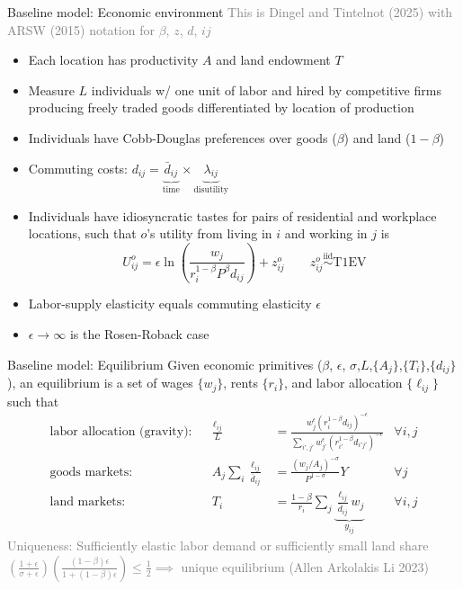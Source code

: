 \documentclass[11pt,notes=hide,aspectratio=169]{beamer}
\begin{document}
\begin{frame}{Baseline model: Economic environment}
\textcolor{gray}{This is Dingel and Tintelnot (2025) with ARSW (2015) notation for $\beta$, $z$, $d$, $ij$}
\begin{itemize}
\item
Each location has productivity $A$ and land endowment $T$
\item 
Measure $L$ individuals w/ one unit of labor
and hired by 
competitive firms producing freely traded goods differentiated by location of production
\item
Individuals have Cobb-Douglas preferences over goods ($\beta$) and land ($1-\beta$) 
\item
Commuting costs: $d_{ij} = \underbrace{\bar{d}_{ij}}_{\text{time}} \times \underbrace{\lambda_{ij}}_{\text{disutility}}$
\item
Individuals have idiosyncratic tastes for pairs of residential and workplace locations,
such that
$o$'s utility from living in $i$ and working in $j$ is
\begin{equation*}
U_{ij}^{o} = \epsilon \ln\left(\frac{w_j}{r_i^{1-\beta} P^\beta d_{ij}}\right) + z_{ij}^{o}
\qquad
z_{ij}^{o} \stackrel{\text{iid}}{\sim} \text{T1EV}
\end{equation*}
\item Labor-supply elasticity equals commuting elasticity $\epsilon$
\item $\epsilon \to \infty$ is the Rosen-Roback case
\end{itemize}
\end{frame}
\begin{frame}{Baseline model: Equilibrium}
Given economic primitives ($\beta$, $\epsilon$, $\sigma$,$L$,$\{A_j\}$,$\{T_i\}$,$\{d_{ij}\}$),
an equilibrium is a set of wages $\{w_j\}$, rents $\{r_i\}$, and labor allocation $\{\ell_{ij}\}$
such that
\begin{align}
\text{labor allocation (gravity):}&&
\frac{\ell_{ij}}{L}
&=
\frac
{w_{j}^\epsilon \left(r_{i}^{1-\beta} d_{ij}\right)^{-\epsilon}}
{\sum_{i',j'}w_{j'}^\epsilon \left(r_{i'}^{1-\beta}  d_{i'j'}\right)^{-\epsilon}}
\label{eqn:cont_laborallocation}
&\forall i,j
\\
\text{goods markets:}&&
A_j \sum_i \frac{\ell_{ij}}{\bar{d}_{ij}} 
&=
\frac{\left({w_j}/{A_j}\right)^{-\sigma}}{P^{1-\sigma}} Y %
&\forall j
\label{eqn:tradeeqlbm:goodsmarketclearing}
\\
\text{land markets:}&&
T_i
&=
\frac{1-\beta}{r_i} \sum_j \underbrace{\frac{\ell_{ij}}{\bar{d}_{ij}} w_j}_{y_{ij}}
&\forall i,j
\label{eqn:tradeeqlbm:landsmarketclearing} 
\end{align}
\textcolor{gray}{Uniqueness: Sufficiently elastic labor demand or sufficiently small land share
$\left(\frac{1+\epsilon}{\sigma + \epsilon}\right) \left(\frac{(1-\beta) \epsilon}{1+(1-\beta) \epsilon}\right) \leq \frac{1}{2} \implies$ unique equilibrium (Allen Arkolakis Li 2023)}
\end{frame}
\end{document}
